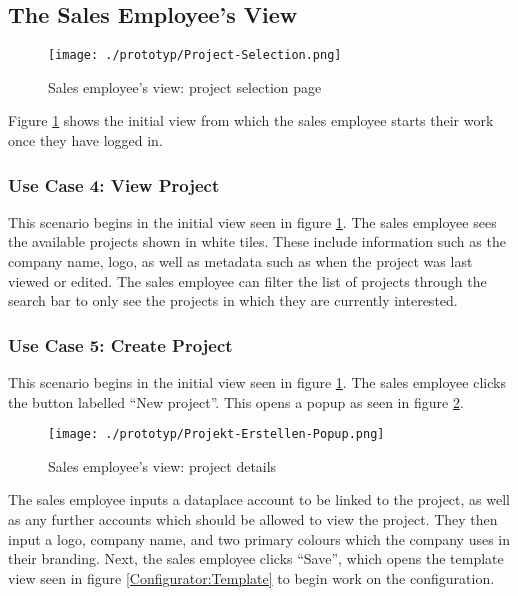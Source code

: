 \subsection{The Sales Employee's View}

\begin{figure}[ht]
  \centering
  \texttt{[image: ./prototyp/Project-Selection.png]}
  \caption{Sales employee's view: project selection page}
  \label{Configurator:ProjectSelection}
\end{figure}

Figure \ref{Configurator:ProjectSelection} shows the initial view from which the sales employee starts their work once they have logged in.


\subsubsection{Use Case 4: View Project}

This scenario begins in the initial view seen in figure \ref{Configurator:ProjectSelection}. The sales employee sees the available projects shown in white tiles. These include information such as the company name, logo, as well as metadata such as when the project was last viewed or edited. The sales employee can filter the list of projects through the search bar to only see the projects in which they are currently interested.


\subsubsection{Use Case 5: Create Project}
This scenario begins in the initial view seen in figure \ref{Configurator:ProjectSelection}. The sales employee clicks the button labelled \enquote{New project}. This opens a popup as seen in figure \ref{Configurator:CreateProjectPopup}. 

\begin{figure}[ht]
  \centering
  \texttt{[image: ./prototyp/Projekt-Erstellen-Popup.png]}
  \caption{Sales employee's view: project details}
  \label{Configurator:CreateProjectPopup}
\end{figure}

The sales employee inputs a \gls{dataplace} account to be linked to the project, as well as any further accounts which should be allowed to view the project. They then input a logo, company name, and two primary colours which the company uses in their branding. Next, the sales employee clicks \enquote{Save}, which opens the template view seen in figure \ref{Configurator:Template} to begin work on the configuration.

